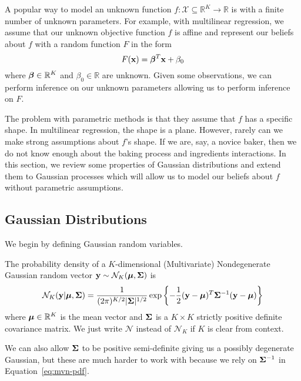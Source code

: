A popular way to model an unknown function $f: \mathcal{X} \subseteq \mathbb{R}^{K} \to \mathbb{R}$
is with a finite number of unknown parameters.
For example, with multilinear regression,
we assume that our unknown objective function $f$ is affine and represent our beliefs about $f$ with a random function $F$ in the form
\begin{equation*}
    F(\mathbf{x}) = \boldsymbol{\beta}^{T} \mathbf{x} + \beta_0
\end{equation*}
where $\boldsymbol{\beta} \in \mathbb{R}^{K}$ and $\beta_0 \in \mathbb{R}$ are unknown.
Given some observations, we can perform inference on our unknown parameters
allowing us
to perform inference on $F$.

The problem with parametric methods is that they assume that $f$ has a specific shape.
In multilinear regression, the shape is a plane.
However, rarely can we make strong assumptions about $f$'s shape.
If we are, say, a novice baker, then we do not know enough about the baking process and ingredients interactions.
In this section, we review some properties of Gaussian distributions and extend them to Gaussian processes which will allow us to model our beliefs about $f$ without parametric assumptions.

\subsection{Gaussian Distributions}\label{ssec:gaus}

We begin by defining Gaussian random variables.
\begin{definition}
    The probability density of a $K$-dimensional (Multivariate) Nondegenerate Gaussian random vector $\mathbf{y} \sim \mathcal{N}_K(\boldsymbol{\mu}, \boldsymbol{\Sigma})$
    is
    \begin{equation}
        \label{eq:mvn-pdf}
        \mathcal{N}_K(\mathbf{y} | \boldsymbol{\mu}, \boldsymbol{\Sigma}) = \frac{ 1 }{ (2 \pi)^{K/2} \lvert \boldsymbol{\Sigma} \rvert^{1/2} } \exp \left\{ -\frac12 (\mathbf{y} - \boldsymbol{\mu})^{T} \boldsymbol{\Sigma}^{-1} (\mathbf{y} - \boldsymbol{\mu})  \right\}
    \end{equation}
    where $\boldsymbol{\mu} \in \mathbb{R}^{K}$ is the mean vector and $\boldsymbol{\Sigma}$ is a $K \times K$ strictly positive definite covariance matrix.
    We just write $\mathcal{N}$ instead of $\mathcal{N}_K$ if $K$ is clear from context.
\end{definition}
We can also allow $\boldsymbol{\Sigma}$ to be positive semi-definite giving us a possibly degenerate Gaussian, but these are much harder to work with because we rely on $\boldsymbol{\Sigma}^{-1}$ in Equation~\ref{eq:mvn-pdf}.

